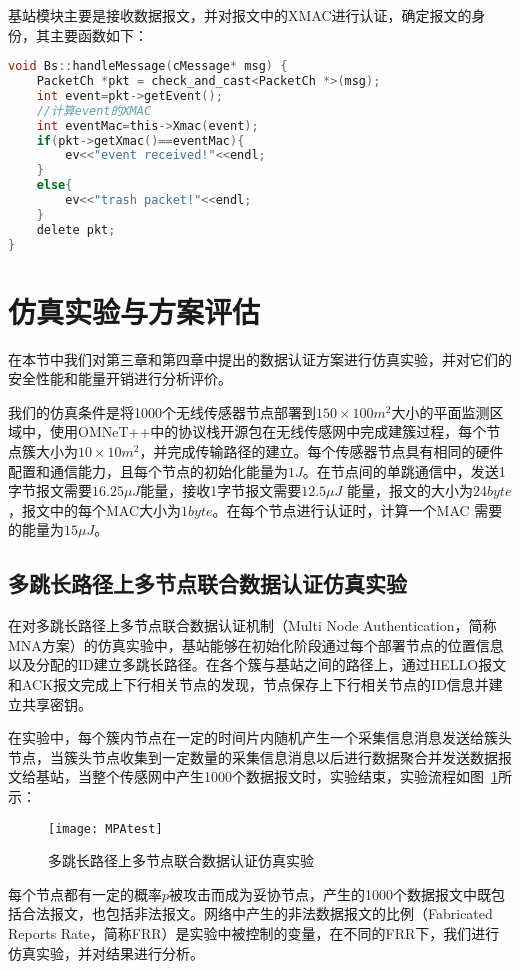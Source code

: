 基站模块主要是接收数据报文，并对报文中的XMAC进行认证，确定报文的身份，其主要函数如下：
\begin{lstlisting}[language=C]
void Bs::handleMessage(cMessage* msg) {
    PacketCh *pkt = check_and_cast<PacketCh *>(msg);
    int event=pkt->getEvent();
    //计算event的XMAC
    int eventMac=this->Xmac(event);
    if(pkt->getXmac()==eventMac){
        ev<<"event received!"<<endl;
    }
    else{
        ev<<"trash packet!"<<endl;
    }
    delete pkt;
}
\end{lstlisting}

\section{仿真实验与方案评估}
在本节中我们对第三章和第四章中提出的数据认证方案进行仿真实验，并对它们的安全性能和能量开销进行分析评价。

我们的仿真条件是将1000个无线传感器节点部署到$150\times 100 m^2$大小的平面监测区域中，使用OMNeT++中的协议栈开源包在无线传感网中完成建簇过程，每个节点簇大小为$10 \times 10 m^2$，并完成传输路径的建立。每个传感器节点具有相同的硬件配置和通信能力，且每个节点的初始化能量为$1J$。在节点间的单跳通信中，发送1 字节报文需要$16.25 \mu J$能量，接收1字节报文需要$12.5 \mu J$ 能量，报文的大小为$24 byte$，报文中的每个MAC大小为$1 byte$。在每个节点进行认证时，计算一个MAC 需要的能量为$15 \mu J$。


\subsection{多跳长路径上多节点联合数据认证仿真实验}
在对多跳长路径上多节点联合数据认证机制（Multi Node Authentication，简称MNA方案）的仿真实验中，基站能够在初始化阶段通过每个部署节点的位置信息以及分配的ID建立多跳长路径。在各个簇与基站之间的路径上，通过HELLO报文和ACK报文完成上下行相关节点的发现，节点保存上下行相关节点的ID信息并建立共享密钥。

在实验中，每个簇内节点在一定的时间片内随机产生一个采集信息消息发送给簇头节点，当簇头节点收集到一定数量的采集信息消息以后进行数据聚合并发送数据报文给基站，当整个传感网中产生1000个数据报文时，实验结束，实验流程如图~\ref{fig:MPAtest}所示：
\begin{figure}[htbp]
  \centering
  \texttt{[image: MPAtest]}
  \caption{多跳长路径上多节点联合数据认证仿真实验}
  \label{fig:MPAtest}
\end{figure}

每个节点都有一定的概率$p$被攻击而成为妥协节点，产生的1000个数据报文中既包括合法报文，也包括非法报文。网络中产生的非法数据报文的比例（Fabricated Reports Rate，简称FRR）是实验中被控制的变量，在不同的FRR下，我们进行仿真实验，并对结果进行分析。

